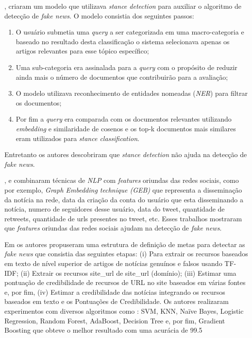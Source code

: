 \citet{DeMagistris2022},  criaram um modelo que utilizava \textit{stance detection} para auxiliar o algoritmo de detecção de \textit{fake news}. 
O modelo consistia dos seguintes passos: 
\begin{enumerate}
    \item  O usuário submetia uma \textit{query} a ser categorizada em uma macro-categoria e baseado no resultado desta classificação o sistema selecionava apenas os artigos relevantes para esse tópico específico; 
    \item Uma sub-categoria era assinalada para a \textit{query} com o propósito de reduzir ainda mais o número de documentos que contribuirão para a avaliação; 
    \item O modelo utilizava reconhecimento de entidades nomeadas (\textit{NER}) para filtrar os documentos; 
    \item Por fim a \textit{query} era comparada com os documentos relevantes utilizando \textit{embedding} e similaridade de cosenos e os top-k documentos mais similares eram utilizados para \textit{stance classification}. 
    \end{enumerate}
    Entretanto os autores descobriram que \textit{stance detection} não ajuda na detecção de \textit{fake news}.


\citet{Wu2021530}, e \citet{Mouratidis20211} combinaram técnicas de \textit{NLP} com \textit{features} oriundas das redes sociais, como por exemplo, \textit{Graph Embedding technique (GEB)} que representa a disseminação da notícia na rede, data da criação da conta do usuário que esta disseminando a notícia, numero de seguidores desse usuário, data do tweet, quantidade de retweets, quantidade de urls presentes no tweet, etc. 
Esses trabalhos mostraram que \textit{features} oriundas das redes sociais ajudam na detecção de \textit{fake news}.

Em \citet{SelvaBirunda2021406} os autores propuseram uma estrutura de definição de metas para detectar as \textit{fake news} que consistia das seguintes etapas: (i) Para extrair os recursos baseados em texto de nível superior de artigos de notícias genuínos e falsos usando TF-IDF; (ii) Extrair os recursos site\_url de site\_url (domínio); (iii) Estimar uma pontuação de credibilidade de recursos de URL no site baseados em várias fontes e, por fim, (iv) Estimar a credibilidade das notícias integrando os recursos baseados em texto e os Pontuações de Credibilidade. Os autores realizaram experimentos com diversos algoritmos como : SVM, KNN, Naïve Bayes, Logistic Regression, Random Forest, AdaBoost, Decision Tree e, por fim, Gradient Boosting que obteve o melhor resultado com uma acurácia de 99.5%

